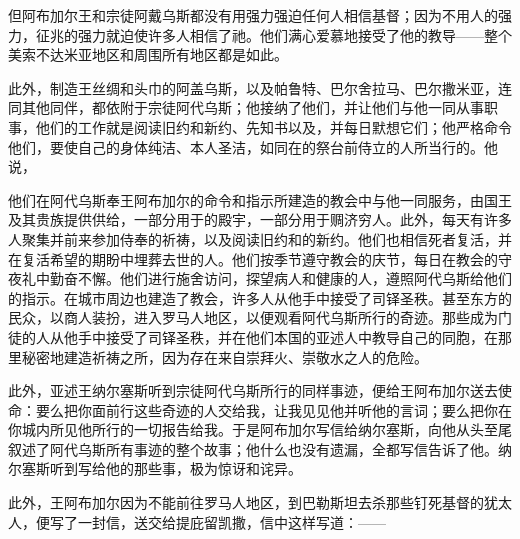 但阿布加尔王和宗徒阿戴乌斯都没有用强力强迫任何人相信基督；因为不用人的强力，征兆的强力就迫使许多人相信了祂。他们满心爱慕地接受了他的教导——整个美索不达米亚地区和周围所有地区都是如此。\par

此外，制造王丝绸和头巾的阿盖乌斯，以及帕鲁特、巴尔舍拉马、巴尔撒米亚，连同其他同伴，都依附于宗徒阿代乌斯；他接纳了他们，并让他们与他一同从事职事，他们的工作就是阅读旧约和新约、先知书以及，并每日默想它们；他严格命令他们，要使自己的身体纯洁、本人圣洁，如同在的祭台前侍立的人所当行的。他说，\par

他们在阿代乌斯奉王阿布加尔的命令和指示所建造的教会中与他一同服务，由国王及其贵族提供供给，一部分用于的殿宇，一部分用于赒济穷人。此外，每天有许多人聚集并前来参加侍奉的祈祷，以及阅读旧约和的新约。他们也相信死者复活，并在复活希望的期盼中埋葬去世的人。他们按季节遵守教会的庆节，每日在教会的守夜礼中勤奋不懈。他们进行施舍访问，探望病人和健康的人，遵照阿代乌斯给他们的指示。在城市周边也建造了教会，许多人从他手中接受了司铎圣秩。甚至东方的民众，以商人装扮，进入罗马人地区，以便观看阿代乌斯所行的奇迹。那些成为门徒的人从他手中接受了司铎圣秩，并在他们本国的亚述人中教导自己的同胞，在那里秘密地建造祈祷之所，因为存在来自崇拜火、崇敬水之人的危险。\par

此外，亚述王纳尔塞斯听到宗徒阿代乌斯所行的同样事迹，便给王阿布加尔送去使命：要么把你面前行这些奇迹的人交给我，让我见见他并听他的言词；要么把你在你城内所见他所行的一切报告给我。于是阿布加尔写信给纳尔塞斯，向他从头至尾叙述了阿代乌斯所有事迹的整个故事；他什么也没有遗漏，全都写信告诉了他。纳尔塞斯听到写给他的那些事，极为惊讶和诧异。\par

此外，王阿布加尔因为不能前往罗马人地区，到巴勒斯坦去杀那些钉死基督的犹太人，便写了一封信，送交给提庇留凯撒，信中这样写道：——\par

